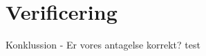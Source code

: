 \documentclass[class=report, crop=false]{standalone}
\begin{document}
    \section{Verificering}
    Konklussion -\> Er vores antagelse korrekt? test
\end{document}
